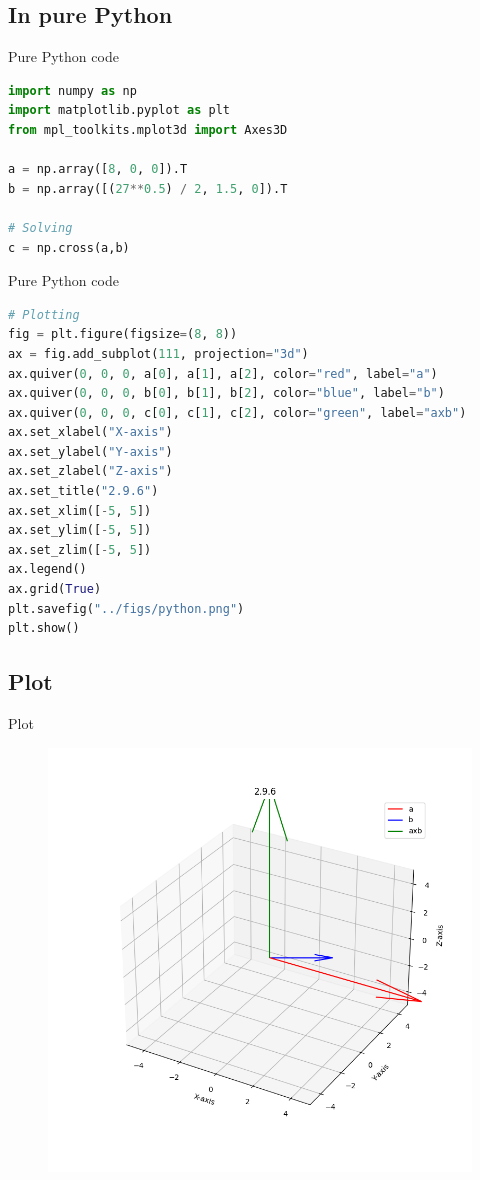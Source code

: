 \documentclass{beamer}
\theoremstyle{remark}
\numberwithin{equation}{section}
\begin{document}
\subsection{In pure Python}
\begin{frame}[fragile]{Pure Python code}
 \begin{lstlisting}[language=Python]
import numpy as np
import matplotlib.pyplot as plt
from mpl_toolkits.mplot3d import Axes3D

a = np.array([8, 0, 0]).T
b = np.array([(27**0.5) / 2, 1.5, 0]).T

# Solving
c = np.cross(a,b)
 \end{lstlisting}
\end{frame}
\begin{frame}[fragile]{Pure Python code}
 \begin{lstlisting}[language=Python]
# Plotting
fig = plt.figure(figsize=(8, 8))
ax = fig.add_subplot(111, projection="3d")
ax.quiver(0, 0, 0, a[0], a[1], a[2], color="red", label="a")
ax.quiver(0, 0, 0, b[0], b[1], b[2], color="blue", label="b")
ax.quiver(0, 0, 0, c[0], c[1], c[2], color="green", label="axb")
ax.set_xlabel("X-axis")
ax.set_ylabel("Y-axis")
ax.set_zlabel("Z-axis")
ax.set_title("2.9.6")
ax.set_xlim([-5, 5])
ax.set_ylim([-5, 5])
ax.set_zlim([-5, 5])
ax.legend()
ax.grid(True)
plt.savefig("../figs/python.png")
plt.show()

 \end{lstlisting}
\end{frame}
\subsection{Plot}
\begin{frame}{Plot}
 \begin{figure}[H]
    \centering
    \includegraphics[width=0.75\columnwidth]{../figs/python.png}
    \caption*{}
    \label{fig:plot}
\end{figure}
\end{frame}
\end{document}
